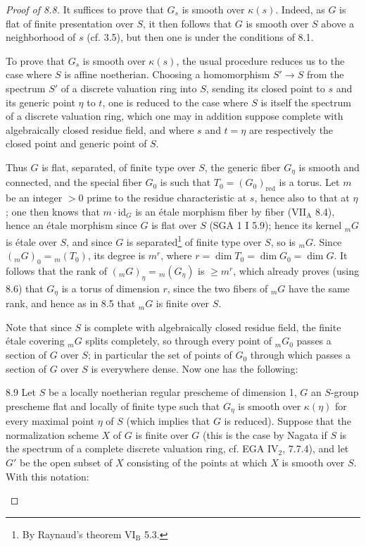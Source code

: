 \begin{proof}[Proof of 8.8]
It suffices to prove that $G_s$ is smooth over $\kappa(s)$. Indeed, as $G$ is flat of finite presentation over $S$, it then follows that $G$ is smooth over $S$ above a neighborhood of $s$ (cf. 3.5), but then one is under the conditions of 8.1.

To prove that $G_s$ is smooth over $\kappa(s)$, the usual procedure reduces us to the case where $S$ is affine noetherian. Choosing a homomorphism $S'\to S$ from the spectrum $S'$ of a discrete valuation ring into $S$, sending its closed point to $s$ and its generic point $\eta$ to $t$, one is reduced to the case where $S$ is itself the spectrum of a discrete valuation ring, which one may in addition suppose complete with algebraically closed residue field, and where $s$ and $t=\eta$ are respectively the closed point and generic point of $S$.

Thus $G$ is flat, separated, of finite type over $S$, the generic fiber $G_\eta$ is smooth and connected, and the special fiber $G_0$ is such that $T_0=(G_0)_{\mathrm{red}}$ is a torus. Let $m$ be an integer $>0$ prime to the residue characteristic at $s$, hence also to that at $\eta$; one then knows that $m\cdot\mathrm{id}_G$ is an étale morphism fiber by fiber (VII$_{\mathrm A}$ 8.4), hence an étale morphism since $G$ is flat over $S$ (SGA 1 I 5.9); hence its kernel ${}_mG$ is étale over $S$, and since $G$ is separated\footnote{By Raynaud's theorem VI$_{\mathrm B}$ 5.3.} of finite type over $S$, so is ${}_mG$. Since $({}_mG)_0={}_m(T_0)$, its degree is $m^r$, where $r=\dim T_0=\dim G_0=\dim G$. It follows that the rank of $({}_mG)_\eta={}_m(G_\eta)$ is $\geq m^r$, which already proves (using 8.6) that $G_\eta$ is a torus of dimension $r$, since the two fibers of ${}_mG$ have the same rank, and hence as in 8.5 that ${}_mG$ is finite over $S$.

Note that since $S$ is complete with algebraically closed residue field, the finite étale covering ${}_mG$ splits completely, so through every point of ${}_mG_0$ passes a section of $G$ over $S$; in particular the set of points of $G_0$ through which passes a section of $G$ over $S$ is everywhere dense. Now one has the following:
\begin{lemma}{8.9}\label{X.8.9}
Let $S$ be a locally noetherian regular prescheme of dimension 1, $G$ an $S$-group prescheme flat and locally of finite type such that $G_\eta$ is smooth over $\kappa(\eta)$ for every maximal point $\eta$ of $S$ (which implies that $G$ is reduced). Suppose that the normalization scheme $X$ of $G$ is finite over $G$ (this is the case by Nagata if $S$ is the spectrum of a complete discrete valuation ring, cf. EGA IV$_2$, 7.7.4), and let $G'$ be the open subset of $X$ consisting of the points at which $X$ is smooth over $S$. With this notation:


\end{lemma}
\end{proof}
